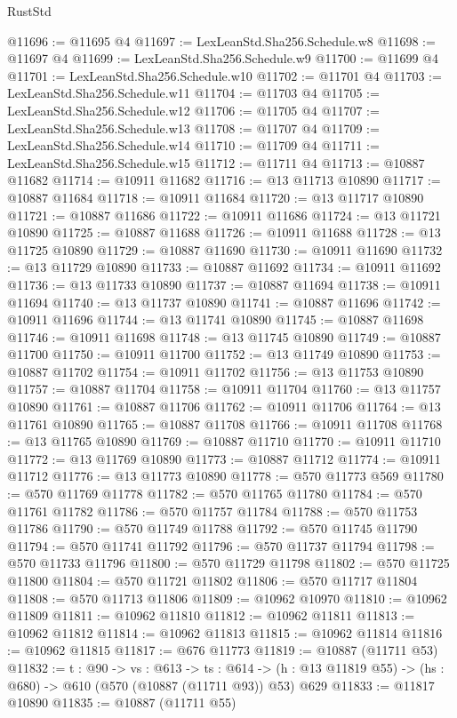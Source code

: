 \begin{lexlean}{RustStd}
\begin{coremodule}
@11696 := @11695 @4
@11697 := LexLeanStd.Sha256.Schedule.w8
@11698 := @11697 @4
@11699 := LexLeanStd.Sha256.Schedule.w9
@11700 := @11699 @4
@11701 := LexLeanStd.Sha256.Schedule.w10
@11702 := @11701 @4
@11703 := LexLeanStd.Sha256.Schedule.w11
@11704 := @11703 @4
@11705 := LexLeanStd.Sha256.Schedule.w12
@11706 := @11705 @4
@11707 := LexLeanStd.Sha256.Schedule.w13
@11708 := @11707 @4
@11709 := LexLeanStd.Sha256.Schedule.w14
@11710 := @11709 @4
@11711 := LexLeanStd.Sha256.Schedule.w15
@11712 := @11711 @4
@11713 := @10887 @11682
@11714 := @10911 @11682
@11716 := @13 @11713 @10890
@11717 := @10887 @11684
@11718 := @10911 @11684
@11720 := @13 @11717 @10890
@11721 := @10887 @11686
@11722 := @10911 @11686
@11724 := @13 @11721 @10890
@11725 := @10887 @11688
@11726 := @10911 @11688
@11728 := @13 @11725 @10890
@11729 := @10887 @11690
@11730 := @10911 @11690
@11732 := @13 @11729 @10890
@11733 := @10887 @11692
@11734 := @10911 @11692
@11736 := @13 @11733 @10890
@11737 := @10887 @11694
@11738 := @10911 @11694
@11740 := @13 @11737 @10890
@11741 := @10887 @11696
@11742 := @10911 @11696
@11744 := @13 @11741 @10890
@11745 := @10887 @11698
@11746 := @10911 @11698
@11748 := @13 @11745 @10890
@11749 := @10887 @11700
@11750 := @10911 @11700
@11752 := @13 @11749 @10890
@11753 := @10887 @11702
@11754 := @10911 @11702
@11756 := @13 @11753 @10890
@11757 := @10887 @11704
@11758 := @10911 @11704
@11760 := @13 @11757 @10890
@11761 := @10887 @11706
@11762 := @10911 @11706
@11764 := @13 @11761 @10890
@11765 := @10887 @11708
@11766 := @10911 @11708
@11768 := @13 @11765 @10890
@11769 := @10887 @11710
@11770 := @10911 @11710
@11772 := @13 @11769 @10890
@11773 := @10887 @11712
@11774 := @10911 @11712
@11776 := @13 @11773 @10890
@11778 := @570 @11773 @569
@11780 := @570 @11769 @11778
@11782 := @570 @11765 @11780
@11784 := @570 @11761 @11782
@11786 := @570 @11757 @11784
@11788 := @570 @11753 @11786
@11790 := @570 @11749 @11788
@11792 := @570 @11745 @11790
@11794 := @570 @11741 @11792
@11796 := @570 @11737 @11794
@11798 := @570 @11733 @11796
@11800 := @570 @11729 @11798
@11802 := @570 @11725 @11800
@11804 := @570 @11721 @11802
@11806 := @570 @11717 @11804
@11808 := @570 @11713 @11806
@11809 := @10962 @10970
@11810 := @10962 @11809
@11811 := @10962 @11810
@11812 := @10962 @11811
@11813 := @10962 @11812
@11814 := @10962 @11813
@11815 := @10962 @11814
@11816 := @10962 @11815
@11817 := @676 @11773
@11819 := @10887 (@11711 @53)
@11832 := {t : @90} ->
  {vs : @613} ->
  {ts : @614} -> (h : @13 @11819 @55) -> (hs : @680) -> @610 (@570 (@10887 (@11711 @93)) @53) @629
@11833 := @11817 @10890
@11835 := @10887 (@11711 @55)

\end{coremodule}
\end{lexlean}
